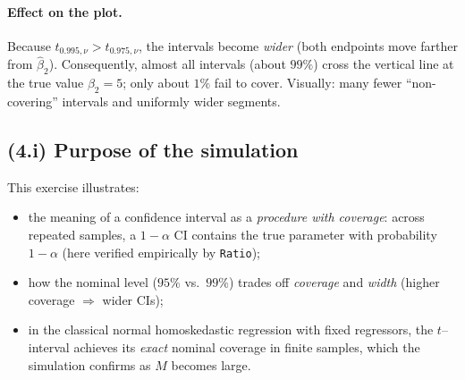 \documentclass{article}
\begin{document}
\paragraph{Effect on the plot.}
Because $t_{0.995,\nu}>t_{0.975,\nu}$, the intervals become \emph{wider} (both endpoints move farther from
$\widehat\beta_2$). Consequently, almost all intervals (about $99\%$) cross the vertical line at the true value
$\beta_2=5$; only about $1\%$ fail to cover. Visually: many fewer “non-covering” intervals and uniformly wider
segments.

\subsection*{(4.i) Purpose of the simulation}

This exercise illustrates:
\begin{itemize}
  \item the meaning of a confidence interval as a \emph{procedure with coverage}: across repeated samples,
        a $1-\alpha$ CI contains the true parameter with probability $1-\alpha$ (here verified empirically by \texttt{Ratio});
  \item how the nominal level ($95\%$ vs.\ $99\%$) trades off \emph{coverage} and \emph{width} (higher coverage $\Rightarrow$ wider CIs);
  \item in the classical normal homoskedastic regression with fixed regressors, the $t$–interval achieves
        its \emph{exact} nominal coverage in finite samples, which the simulation confirms as $M$ becomes large.
\end{itemize}
\end{document}
